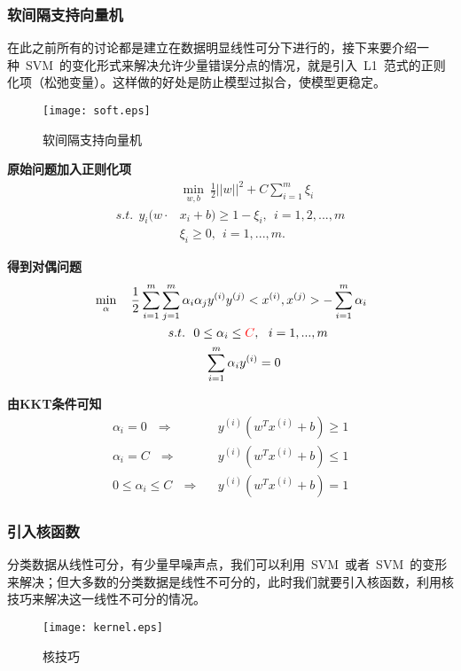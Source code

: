 \subsubsection{软间隔支持向量机}
在此之前所有的讨论都是建立在数据明显线性可分下进行的，接下来要介绍一种~SVM~的变化形式来解决允许少量错误分点的情况，就是引入~L1~范式的正则化项（松弛变量）。这样做的好处是防止模型过拟合，使模型更稳定。
\begin{figure}[!htb]
  \centering
  \texttt{[image: soft.eps]}
  \caption{软间隔支持向量机}
\end{figure}

\textbf{原始问题加入正则化项} ~~
\begin{align}
            &\min \limits_{w,b} ~\frac{1}{2}||w||^2 + C\sum_{i=1}^{m}\xi_i  \nonumber  \\
    s.t.~~  y_i(w\cdot& x_i+b) \geq 1-\xi_i,~~i=1,2,...,m\nonumber\\
            ~~~&\xi_i\geq 0,~~i=1,...,m. \nonumber
\end{align}

\textbf{得到对偶问题} ~~
\begin{align}
            &\min \limits_\alpha ~~~\frac{1}{2}\sum_{i=1}^{m}\sum_{j=1}^{m}\alpha_i\alpha_jy^{(i)}y^{(j)}<x^{(i)},x^{(j)}>-\sum_{i=1}^{m}\alpha_i \nonumber\nonumber\\
         &~~~~~~~~~~~~~~~~~~s.t.~~0 \leq\alpha_i\leq \textcolor{red}{C},~~i=1,...,m \nonumber \\
               &~~~~~~~~~~~~~~~~~~~~~~~~~~~\sum_{i=1}^{m}\alpha_iy^{(i)}=0 \nonumber
\end{align}

\textbf{由KKT条件可知}
\begin{align}
    \alpha_i=0 ~~~ \Rightarrow  &~~~y^{(i)}(w^Tx^{(i)}+b)\geq1   \nonumber\\
    \alpha_i=C ~~~ \Rightarrow &~~~y^{(i)}(w^Tx^{(i)}+b)\leq1   \nonumber\\
    0\leq\alpha_i\leq C ~~~ \Rightarrow &~~~y^{(i)}(w^Tx^{(i)}+b)=1   \nonumber
\end{align}

\subsubsection{引入核函数}
分类数据从线性可分，有少量早噪声点，我们可以利用~SVM~或者~SVM~的变形来解决；但大多数的分类数据是线性不可分的，此时我们就要引入核函数，利用核技巧来解决这一线性不可分的情况。

\begin{figure}[!htb]
  \centering
  \texttt{[image: kernel.eps]}
  \caption{核技巧}
\end{figure}

